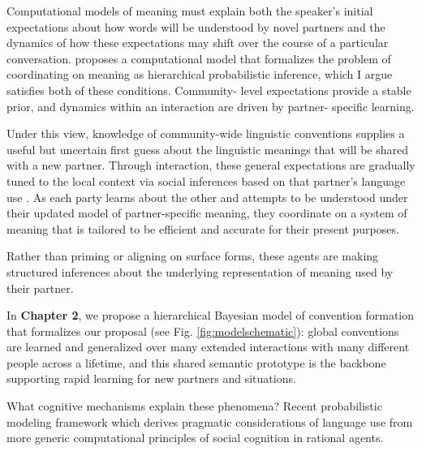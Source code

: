 \documentclass[11pt]{article}
\begin{document}

Computational models of meaning must explain both the speaker’s initial expectations about how words will be understood by novel partners and the dynamics of how these expectations may shift over the course of a particular conversation. proposes a computational model that formalizes the problem of coordinating on meaning as hierarchical probabilistic inference, which I argue satisfies both of these conditions. Community- level expectations provide a stable prior, and dynamics within an interaction are driven by partner- specific learning.


Under this view, knowledge of community-wide linguistic conventions \cite{Lewis69_Convention} supplies a useful but uncertain first guess about the linguistic meanings that will be shared with a new partner. 
Through interaction, these general expectations are gradually tuned to the local context via social inferences based on that partner's language use  \cite{clark_using_1996,davidson_nice_1986}. 
As each party learns about the other and attempts to be understood under their updated model of partner-specific meaning, they coordinate on a system of meaning that is tailored to be efficient and accurate for their present purposes.

Rather than priming or aligning on surface forms, these agents are making structured inferences about the underlying representation of meaning used by their partner.

In \textbf{Chapter 2}, we propose a hierarchical Bayesian model of convention formation that formalizes our proposal (see Fig. \ref{fig:modelschematic}): global conventions are learned and generalized over many extended interactions with many different people across a lifetime, and this shared semantic prototype is the backbone supporting rapid learning for new partners and situations. 

What cognitive mechanisms explain these phenomena? 
Recent probabilistic modeling framework which derives pragmatic considerations of language use from more generic computational principles of social cognition in rational agents.
\end{document}
